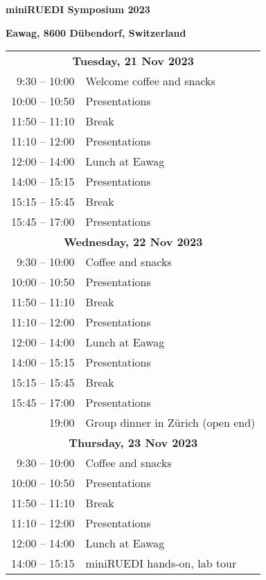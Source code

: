\documentclass[12pt]{extbook}
\begin{document}
\thispagestyle{empty}
\begin{center}

{\LARGE \bf miniRUEDI Symposium 2023}

\bigskip
\bigskip
\bigskip

{\large \bf Eawag, 8600 Dübendorf, Switzerland}

\bigskip
\bigskip
\bigskip
\bigskip
\bigskip
\bigskip

\begin{tabular}{r@{\hskip 0.5in}l}

\multicolumn{2}{c}{\bf Tuesday, 21 Nov 2023}\\[2ex]
9:30  -- 10:00	&	Welcome coffee and snacks\\
10:00 -- 10:50	&	Presentations\\
11:50 -- 11:10	&	Break\\
11:10 -- 12:00	& Presentations\\
12:00 -- 14:00	&	Lunch at Eawag\\
14:00 -- 15:15	&	Presentations\\
15:15 -- 15:45	&	Break\\
15:45 -- 17:00	&	Presentations\\[8ex]

\multicolumn{2}{c}{\bf Wednesday, 22 Nov 2023}\\[2ex]
9:30  -- 10:00	&	Coffee and snacks\\
10:00 -- 10:50	&	Presentations\\
11:50 -- 11:10	&	Break\\
11:10 -- 12:00	& Presentations\\
12:00 -- 14:00	&	Lunch at Eawag\\
14:00 -- 15:15	&	Presentations\\
15:15 -- 15:45	&	Break\\
15:45 -- 17:00	&	Presentations\\
19:00 \phantom{-- 00:00}	&	Group dinner in Zürich (open end)\\[8ex]

\multicolumn{2}{c}{\bf Thursday, 23 Nov 2023}\\[2ex]
9:30  -- 10:00	&	Coffee and snacks\\
10:00 -- 10:50	&	Presentations\\
11:50 -- 11:10	&	Break\\
11:10 -- 12:00	& Presentations\\
12:00 -- 14:00	&	Lunch at Eawag\\
14:00 -- 15:15	&	miniRUEDI hands-on, lab tour\\[1.5ex]

\end{tabular}

\end{center}
\end{document}
